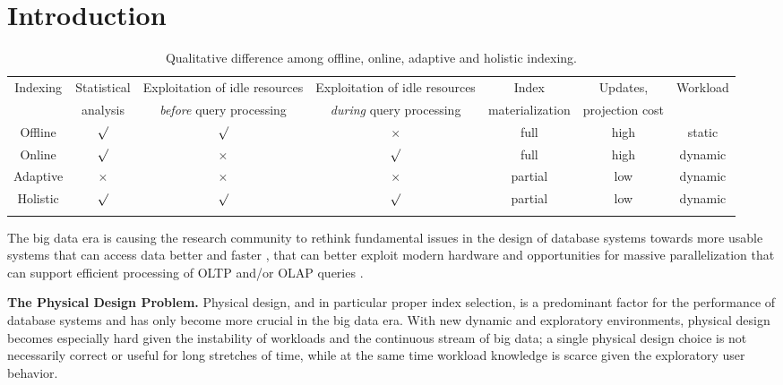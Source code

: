 \section{Introduction}
\label{sec:intro}

\begin{table*}
\begin{center}

\begin{tabular}{ccccccc}
\hline
\cline{1-7}
Indexing& Statistical&Exploitation of idle resources & Exploitation of idle resources & Index  		 & Updates, & Workload\\
        & analysis   & \emph{before} query processing& \emph{during} query processing & materialization  & projection cost &\\
\hline
Offline & $\surd$ & $\surd$ & $\times$  & full & high & static \\ 
Online & $\surd$ & $\times$ & $\surd$  & full & high & dynamic\\
Adaptive & $\times$ & $\times$ & $\times$  & partial & low & dynamic\\
Holistic & $\surd$ & $\surd$ & $\surd$  & partial & low & dynamic\\
\hline
\label{tab:qualitative}
\end{tabular}
\vspace{-0.45cm}
 \caption{Qualitative difference among offline, online, adaptive and holistic indexing.}
\vspace{-0.7cm}
\end{center}
\end{table*}

The big data era is causing the research community to rethink fundamental issues 
in the design of database systems  
towards more usable systems \cite{UsableDatabases} that can access data better and faster 
\cite{exploration,hinge, hazy,earl},
 that can better exploit modern hardware and opportunities for massive parallelization
\cite{hadoop+}
 that can support efficient processing of OLTP and/or OLAP queries
 \cite{nodb,hstore,hyper,bitweaving}.

\textbf{The Physical Design Problem.} 
Physical design, and in particular proper index selection, is a predominant factor for the performance of database systems and has only become more crucial in the big data era.
With new dynamic and exploratory environments, physical design becomes especially hard given the instability of workloads and the continuous stream of big data; a single physical design choice is not necessarily correct or useful for long stretches of time, while at the same time workload knowledge is scarce given the exploratory user behavior.

